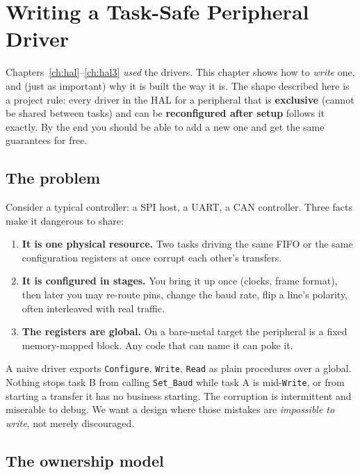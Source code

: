 \chapter{Writing a Task-Safe Peripheral Driver}
\label{ch:driver-design}

Chapters~\ref{ch:hal}--\ref{ch:hal3} \emph{used} the drivers. This chapter shows
how to \emph{write} one, and (just as important) why it is built the way it
is. The shape described here is a project rule: every driver in the HAL for a
peripheral that is \textbf{exclusive} (cannot be shared between tasks) and can be
\textbf{reconfigured after setup} follows it exactly. By the end you should be
able to add a new one and get the same guarantees for free.

\section{The problem}

Consider a typical controller: a SPI host, a UART, a CAN controller. Three
facts make it dangerous to share:

\begin{enumerate}
\item \textbf{It is one physical resource.} Two tasks driving the same FIFO or
  the same configuration registers at once corrupt each other's transfers.
\item \textbf{It is configured in stages.} You bring it up once (clocks, frame
  format), then later you may re-route pins, change the baud rate, flip a line's
  polarity, often interleaved with real traffic.
\item \textbf{The registers are global.} On a bare-metal target the peripheral is
  a fixed memory-mapped block. Any code that can name it can poke it.
\end{enumerate}

A naive driver exports \texttt{Configure}, \texttt{Write}, \texttt{Read} as plain
procedures over a global. Nothing stops task B from calling \texttt{Set\_Baud}
while task A is mid-\texttt{Write}, or from starting a transfer it has no business
starting. The corruption is intermittent and miserable to debug. We want a design
where those mistakes are \emph{impossible to write}, not merely discouraged.

\section{The ownership model}

